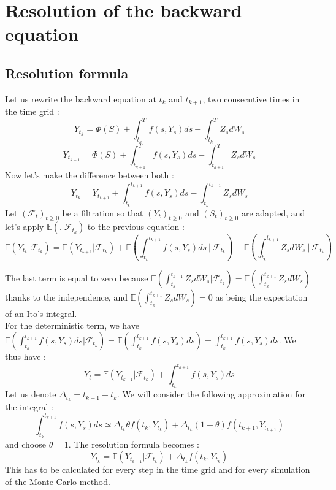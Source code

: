 \documentclass[a4paper,11pt,english]{book}
\begin{document}
\section{Resolution of the backward equation}
\subsection{Resolution formula}
Let us rewrite the backward equation at $t_{k}$ and $t_{k+1}$, two consecutive times in the time grid :
$$Y_{t_{k}} = \Phi(S) + \int_{t_{k}}^{T} f(s,Y_{s}) ds - \int_{t_{k}}^{T} Z_{s} dW_{s}$$
$$Y_{t_{k+1}} = \Phi(S) + \int_{t_{k+1}}^{T} f(s,Y_{s}) ds - \int_{t_{k+1}}^{T} Z_{s} dW_{s}$$
Now let's make the difference between both :
\begin{equation}
    Y_{t_{k}} = Y_{t_{k+1}} + \int_{t_{k}}^{t_{k+1}} f(s,Y_{s}) ds - \int_{t_{k}}^{t_{k+1}}Z_{s} dW_{s}
    \label{eq:Y_t}
\end{equation}
Let $(\mathcal{F}_{t})_{t\geq0}$ be a filtration so that $(Y_{t})_{t\geq0}$ and $(S_{t})_{t\geq0}$ are adapted, and let's apply $\mathbb{E}(.|\mathcal{F}_{t_{k}})$ to the previous equation :
$$\mathbb{E}(Y_{t_{k}}|\mathcal{F}_{t_{k}}) = \mathbb{E}(Y_{t_{k+1}}|\mathcal{F}_{t_{k}}) + \mathbb{E}\left(\int_{t_{k}}^{t_{k+1}} f(s,Y_{s}) ds~\bigg\vert~\mathcal{F}_{t_{k}}\right) - \mathbb{E}\left(\int_{t_{k}}^{t_{k+1}}Z_{s} dW_{s}~\bigg\vert~\mathcal{F}_{t_{k}}\right)$$

The last term is equal to zero because $\mathbb{E}(\int_{t_{k}}^{t_{k+1}}Z_{s} dW_{s}|\mathcal{F}_{t_{k}})=\mathbb{E}(\int_{t_{k}}^{t_{k+1}}Z_{s} dW_{s})$ thanks to the independence, and $\mathbb{E}(\int_{t_{k}}^{t_{k+1}}Z_{s} dW_{s})=0$ as being the expectation of an Ito's integral.\\
For the deterministic term, we have $\mathbb{E}(\int_{t_{k}}^{t_{k+1}}f(s,Y_{s}) ds|\mathcal{F}_{t_{k}})=\mathbb{E}(\int_{t_{k}}^{t_{k+1}}f(s,Y_{s}) ds) = \int_{t_{k}}^{t_{k+1}}f(s,Y_{s}) ds$.
We thus have :
\begin{equation}
    Y_t = \mathbb{E}(Y_{t_{k+1}}|\mathcal{F}_{t_{k}}) + \int_{t_{k}}^{t_{k+1}}f(s,Y_{s}) ds
\end{equation}
Let us denote $\Delta_{t_k}=t_{k+1}-t_{k}$. We will consider the following approximation for the integral :
$$\int_{t_{k}}^{t_{k+1}}f(s,Y_{s})ds \simeq \Delta_{t_{k}}\theta f(t_{k},Y_{t_{k}}) + \Delta_{t_{k}}(1-\theta) f(t_{k+1},Y_{t_{k+1}})$$
and choose $\theta=1$. The resolution formula becomes :
\begin{equation}
Y_{t_{k}} = \mathbb{E}(Y_{t_{k+1}}|\mathcal{F}_{t_{k}}) + \Delta_{t_{k}}f(t_{k},Y_{t_{k}})
\label{resolutionFormula}
\end{equation}
This has to be calculated for every step in the time grid and for every simulation of the Monte Carlo method.
\end{document}
